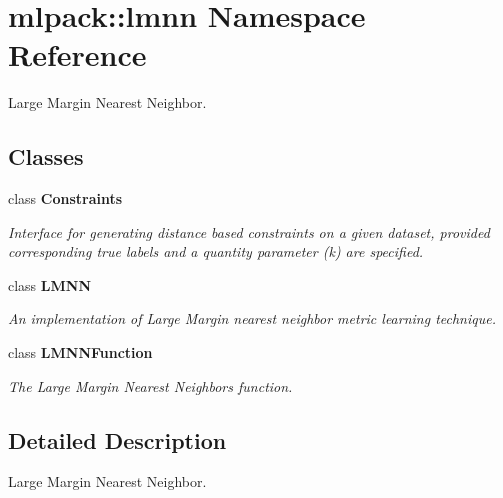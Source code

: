 \section{mlpack\+:\+:lmnn Namespace Reference}
\label{namespacemlpack_1_1lmnn}


Large Margin Nearest Neighbor.  


\subsection*{Classes}
\begin{DoxyCompactItemize}
\item 
class \textbf{ Constraints}
\begin{DoxyCompactList}\small\item\em Interface for generating distance based constraints on a given dataset, provided corresponding true labels and a quantity parameter (k) are specified. \end{DoxyCompactList}\item 
class \textbf{ L\+M\+NN}
\begin{DoxyCompactList}\small\item\em An implementation of Large Margin nearest neighbor metric learning technique. \end{DoxyCompactList}\item 
class \textbf{ L\+M\+N\+N\+Function}
\begin{DoxyCompactList}\small\item\em The Large Margin Nearest Neighbors function. \end{DoxyCompactList}\end{DoxyCompactItemize}


\subsection{Detailed Description}
Large Margin Nearest Neighbor. 

